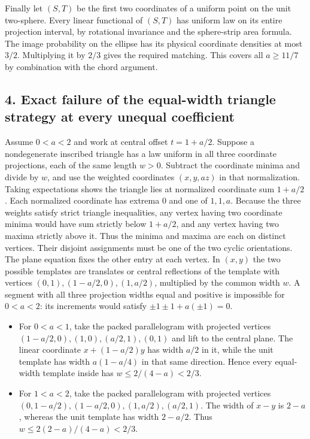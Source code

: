 \documentclass[
  10pt,
]{article}
\providecommand{\tightlist}{%
  \setlength{\itemsep}{0pt}\setlength{\parskip}{0pt}}
\begin{document}
Finally let \((S,T)\) be the first two coordinates of a uniform point on
the unit two-sphere. Every linear functional of \((S,T)\) has uniform
law on its entire projection interval, by rotational invariance and the
sphere-strip area formula. The image probability on the ellipse has its
physical coordinate densities at most \(3/2\). Multiplying it by \(2/3\)
gives the required matching. This covers all \(a\ge11/7\) by combination
with the chord argument.

\subsection{4. Exact failure of the equal-width triangle strategy at
every unequal
coefficient}\label{exact-failure-of-the-equal-width-triangle-strategy-at-every-unequal-coefficient}

Assume \(0<a<2\) and work at central offset \(t=1+a/2\). Suppose a
nondegenerate inscribed triangle has a law uniform in all three
coordinate projections, each of the same length \(w>0\). Subtract the
coordinate minima and divide by \(w\), and use the weighted coordinates
\((x,y,az)\) in that normalization. Taking expectations shows the
triangle lies at normalized coordinate sum \(1+a/2\). Each normalized
coordinate has extrema \(0\) and one of \(1,1,a\). Because the three
weights satisfy strict triangle inequalities, any vertex having two
coordinate minima would have sum strictly below \(1+a/2\), and any
vertex having two maxima strictly above it. Thus the minima and maxima
are each on distinct vertices. Their disjoint assignments must be one of
the two cyclic orientations. The plane equation fixes the other entry at
each vertex. In \((x,y)\) the two possible templates are translates or
central reflections of the template with vertices
\((0,1),(1-a/2,0),(1,a/2)\), multiplied by the common width \(w\). A
segment with all three projection widths equal and positive is
impossible for \(0<a<2\): its increments would satisfy
\(\pm1\pm1+a(\pm1)=0\).

\begin{itemize}
\tightlist
\item
  For \(0<a<1\), take the packed parallelogram with projected vertices
  \((1-a/2,0),(1,0),(a/2,1),(0,1)\) and lift to the central plane. The
  linear coordinate \(x+(1-a/2)y\) has width \(a/2\) in it, while the
  unit template has width \(a(1-a/4)\) in that same direction. Hence
  every equal-width template inside has \(w\le2/(4-a)<2/3\).
\item
  For \(1<a<2\), take the packed parallelogram with projected vertices
  \((0,1-a/2),(1-a/2,0),(1,a/2),(a/2,1)\). The width of \(x-y\) is
  \(2-a\), whereas the unit template has width \(2-a/2\). Thus
  \(w\le2(2-a)/(4-a)<2/3\).
\end{itemize}
\end{document}
